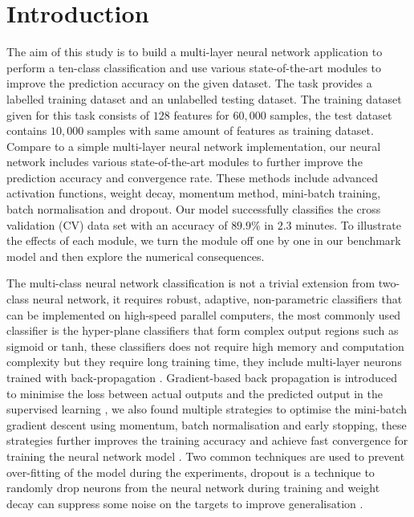 \section{Introduction\label{chapter1}}

The aim of this study is to build a multi-layer neural network application to perform a ten-class classification and use various state-of-the-art modules to improve the prediction accuracy on the given dataset.
The task provides a labelled training dataset and an unlabelled testing dataset.
The training dataset given for this task consists of $128$ features for $60,000$ samples,
the test dataset contains $10,000$ samples with same amount of features as training dataset.
Compare to a simple multi-layer neural network implementation,%
our neural network includes various state-of-the-art modules to further improve the prediction accuracy and convergence rate. These methods include advanced activation functions, 
weight decay, 
momentum method,
mini-batch training, batch normalisation and dropout. 
Our model successfully classifies the cross validation (CV) data set with an accuracy of $89.9\%$ in $2.3$ minutes. 
To illustrate the effects of each module, we turn the module off one by one in our benchmark model and then explore the numerical consequences.

The multi-class neural network classification is not a trivial extension from two-class neural network,
it requires robust, adaptive, non-parametric classifiers that can be implemented on high-speed parallel computers,
the most commonly used classifier is the hyper-plane classifiers that form complex output regions such as sigmoid or tanh,
these classifiers does not require high memory and computation complexity but they require long training time,
they include multi-layer neurons trained with back-propagation \citep{werbos1990backpropagation}.
Gradient-based back propagation is introduced to minimise the loss between actual outputs and the predicted output in the supervised learning \citet{lecun1998Gradient},
we also found multiple strategies to optimise the mini-batch gradient descent using momentum, batch normalisation and early stopping,
these strategies further improves the training accuracy and achieve fast convergence for training the neural network model \citep{ruder2016overview}.
Two common techniques are used to prevent over-fitting of the model during the experiments, dropout is a technique to randomly drop neurons from the neural network during training \citet{dropout} and weight decay can suppress some noise on the targets to improve generalisation \citep{NIPS1991_563}.

